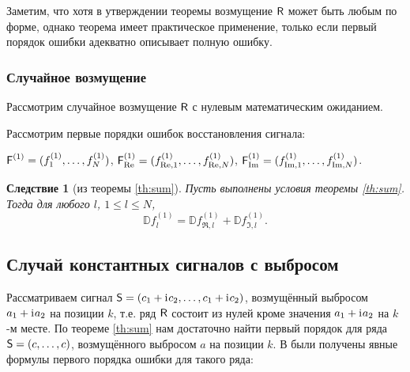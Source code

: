 \documentclass[specialist,
               substylefile = spbu.rtx,
               subf,href,colorlinks=true, 12pt]{disser}
\newtheorem{remark}{Замечание}
\newtheorem{corollary}{Следствие}
\begin{document}
Заметим, что хотя в утверждении теоремы возмущение $\textsf{R}$ может быть любым по форме, однако теорема имеет практическое применение, только если первый порядок ошибки адекватно описывает полную ошибку.

\subsubsection{Случайное возмущение}

Рассмотрим случайное возмущение $\textsf{R}$ с нулевым математическим ожиданием.

Рассмотрим первые порядки ошибок восстановления сигнала:

$\textsf{F}^{(1)} = (f^{(1)}_1, \ldots, f^{(1)}_N)$, $\textsf{F}^{(1)}_{\Re} = (f^{(1)}_{\Re,1}, \ldots, f^{(1)}_{\Re, N})$, $\textsf{F}^{(1)}_{\Im} = (f^{(1)}_{\Im,1}, \ldots, f^{(1)}_{\Im, N})$.


\begin{corollary}[из теоремы {\ref{th:sum}}] \label{st:dispsum}
	Пусть выполнены условия теоремы \ref{th:sum}.
	Тогда для любого $l$, $1\le l \le N$,
	\begin{equation} \label{eq:dispsum}
		\mathbb{D}f^{(1)}_l = \mathbb{D}f^{(1)}_{\Re, l} + \mathbb{D}f^{(1)}_{\Im, l}.	
	\end{equation}
\end{corollary}





\subsection{Случай константных сигналов с выбросом}
\label{sub:const_outl}
Рассматриваем сигнал $\textsf{S} = (c_1 + \mathrm{i}\mkern1mu c_2, \ldots, c_1 + \mathrm{i}\mkern1mu c_2)$, возмущённый выбросом $a_1 + \mathrm{i}\mkern1mu a_2$ на позиции $k$, т.е. ряд $\textsf{R}$ состоит из нулей кроме значения $a_1 + \mathrm{i}\mkern1mu a_2$ на $k$-м месте. По теореме \ref{th:sum} нам достаточно найти первый порядок для ряда $\textsf{S} = (c, \ldots, c)$, возмущённого выбросом $a$ на позиции $k$. В \cite{SenBach} были получены явные формулы первого порядка ошибки для такого ряда: 
\end{document}
